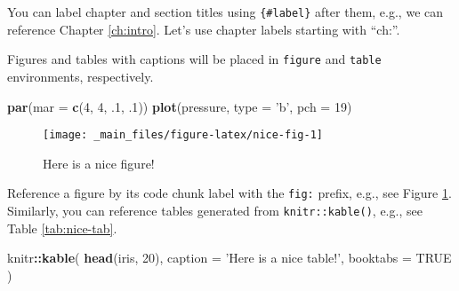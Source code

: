 \documentclass[]{book}
\newenvironment{Shaded}{\begin{snugshade}}{\end{snugshade}}
\newcommand{\KeywordTok}[1]{\textcolor[rgb]{0.13,0.29,0.53}{\textbf{#1}}}
\newcommand{\DataTypeTok}[1]{\textcolor[rgb]{0.13,0.29,0.53}{#1}}
\newcommand{\DecValTok}[1]{\textcolor[rgb]{0.00,0.00,0.81}{#1}}
\newcommand{\FloatTok}[1]{\textcolor[rgb]{0.00,0.00,0.81}{#1}}
\newcommand{\StringTok}[1]{\textcolor[rgb]{0.31,0.60,0.02}{#1}}
\newcommand{\OtherTok}[1]{\textcolor[rgb]{0.56,0.35,0.01}{#1}}
\newcommand{\OperatorTok}[1]{\textcolor[rgb]{0.81,0.36,0.00}{\textbf{#1}}}
\newcommand{\NormalTok}[1]{#1}
\begin{document}
You can label chapter and section titles using \texttt{\{\#label\}}
after them, e.g., we can reference Chapter \ref{ch:intro}. Let's use
chapter labels starting with ``ch:''.

Figures and tables with captions will be placed in \texttt{figure} and
\texttt{table} environments, respectively.

\begin{Shaded}
\begin{Highlighting}[]
\KeywordTok{par}\NormalTok{(}\DataTypeTok{mar =} \KeywordTok{c}\NormalTok{(}\DecValTok{4}\NormalTok{, }\DecValTok{4}\NormalTok{, }\FloatTok{.1}\NormalTok{, }\FloatTok{.1}\NormalTok{))}
\KeywordTok{plot}\NormalTok{(pressure, }\DataTypeTok{type =} \StringTok{'b'}\NormalTok{, }\DataTypeTok{pch =} \DecValTok{19}\NormalTok{)}
\end{Highlighting}
\end{Shaded}

\begin{figure}

{\centering \texttt{[image: \_main\_files/figure-latex/nice-fig-1]} 

}

\caption{Here is a nice figure!}\label{fig:nice-fig}
\end{figure}

Reference a figure by its code chunk label with the \texttt{fig:}
prefix, e.g., see Figure \ref{fig:nice-fig}. Similarly, you can
reference tables generated from \texttt{knitr::kable()}, e.g., see Table
\ref{tab:nice-tab}.

\begin{Shaded}
\begin{Highlighting}[]
\NormalTok{knitr}\OperatorTok{::}\KeywordTok{kable}\NormalTok{(}
  \KeywordTok{head}\NormalTok{(iris, }\DecValTok{20}\NormalTok{), }\DataTypeTok{caption =} \StringTok{'Here is a nice table!'}\NormalTok{,}
  \DataTypeTok{booktabs =} \OtherTok{TRUE}
\NormalTok{)}
\end{Highlighting}
\end{Shaded}
\end{document}
